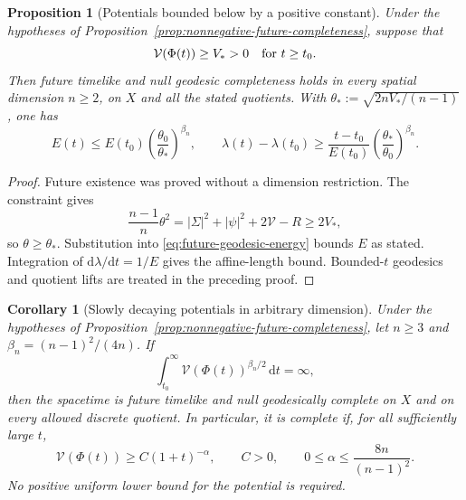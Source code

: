 \documentclass[10pt,a4paper]{article}
\numberwithin{equation}{section}
\newtheorem{proposition}[theorem]{Proposition}
\newtheorem{corollary}[theorem]{Corollary}
\theoremstyle{definition}
\theoremstyle{remark}
\newcommand{\dd}{\mathrm d}
\begin{document}
\begin{proposition}[Potentials bounded below by a positive constant]
\label{prop:positive-floor-future-completeness}
Under the hypotheses of
Proposition~\ref{prop:nonnegative-future-completeness}, suppose that
\begin{equation}
 \mathcal V(\Phi(t))\ge V_*>0\quad\hbox{for }t\ge t_0.
 \label{eq:positive-potential-floor}
\end{equation}
Then future timelike and null geodesic completeness holds in every
spatial dimension $n\ge2$, on $X$ and all the stated quotients.
With $\theta_*:=\sqrt{2nV_*/(n-1)}$, one has
\begin{equation}
 E(t)\le E(t_0)\left(\frac{\theta_0}{\theta_*}\right)^{\beta_n},
 \qquad
 \lambda(t)-\lambda(t_0)
 \ge\frac{t-t_0}{E(t_0)}
       \left(\frac{\theta_*}{\theta_0}\right)^{\beta_n}.
 \label{eq:positive-floor-affine-length}
\end{equation}
\end{proposition}

\begin{proof}
Future existence was proved without a dimension restriction.
The constraint gives
\[
 \frac{n-1}{n}\theta^2
 =|\Sigma|^2+|\psi|^2+2\mathcal V-R\ge2V_*,
\]
so $\theta\ge\theta_*$.  Substitution into
\eqref{eq:future-geodesic-energy} bounds $E$ as stated.
Integration of $\dd\lambda/\dd t=1/E$ gives the affine-length
bound.  Bounded-$t$ geodesics and quotient lifts are treated in the
preceding proof.
\end{proof}

\begin{corollary}[Slowly decaying potentials in arbitrary dimension]
\label{cor:decaying-potential-completeness}
Under the hypotheses of
Proposition~\ref{prop:nonnegative-future-completeness}, let $n\ge3$ and
$\beta_n=(n-1)^2/(4n)$.  If
\begin{equation}
 \int_{t_0}^{\infty}
       \mathcal V(\Phi(t))^{\beta_n/2}\,\dd t=\infty,
 \label{eq:potential-affine-criterion}
\end{equation}
then the spacetime is future timelike and null geodesically complete on
$X$ and on every allowed discrete quotient.  In particular, it is
complete if, for all sufficiently large $t$,
\begin{equation}
 \mathcal V(\Phi(t))\ge C(1+t)^{-\alpha},
 \qquad C>0,\qquad
 0\le\alpha\le\frac{8n}{(n-1)^2}.
 \label{eq:polynomial-potential-floor}
\end{equation}
No positive uniform lower bound for the potential is required.
\end{corollary}
\end{document}
